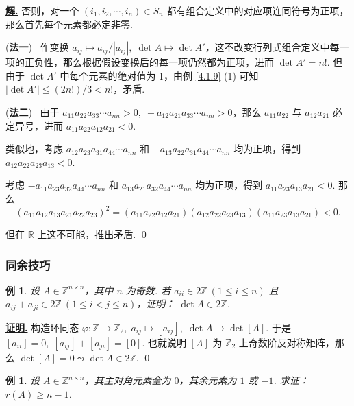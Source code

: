 \documentclass[10pt,openany]{article}
\theoremstyle{thmstyle} %
\theoremstyle{defstyle} %
\theoremstyle{prostyle} %
\theoremstyle{exastyle}
\newtheorem{example}[theorem]{例}
\theoremstyle{remstyle}
\renewenvironment{proof}[1][证明]{\par\underline{\textbf{#1.}} \;\fangsong}{\qed\par}
\newenvironment{solution}{\par\underline{\textbf{解.}} \;\fangsong}{\qed\par}
\newcommand{\R}{\mathbb{R}}
\newcommand{\n}{^{n \times n}}
\begin{document}
\begin{solution}
	否则，对一个 \( (i_1,i_2,\cdots,i_n) \in S_n \) 都有组合定义中的对应项连同符号为正项，那么首先每个元素都必定非零.
	
	(\textbf{法一}) \ 作变换 \( a_{ij} \mapsto a_{ij}/|a_{ij}|, \; \det A \mapsto \det A' \)，这不改变行列式组合定义中每一项的正负性，那么根据假设变换后的每一项仍然都为正项，进而 \( \det A'= n! \). 但由于 \( \det A' \) 中每个元素的绝对值为 1，由例 \ref{4.1.9} (1) 可知 \( |\det A'| \leq (2n!)/3 <n! \)，矛盾.
	
	(\textbf{法二}) \ 由于 \( a_{11}a_{22}a_{33}\cdots a_{nn}>0, \; -a_{12}a_{21}a_{33}\cdots a_{nn}>0 \)，那么 \( a_{11}a_{22} \) 与 \( a_{12}a_{21} \) 必定异号，进而 \( a_{11}a_{22}a_{12}a_{21}<0\). 
	
	类似地，考虑 \( a_{12}a_{23}a_{31}a_{44}\cdots a_{nn} \) 和 \( -a_{13}a_{22}a_{31}a_{44}\cdots a_{nn} \) 均为正项，得到 \( a_{12}a_{22}a_{23}a_{13}<0 \). 
	
	考虑 \( -a_{11}a_{23}a_{32}a_{44}\cdots a_{nn} \) 和 \( a_{13}a_{21}a_{32}a_{44}\cdots a_{nn} \) 均为正项，得到 \( a_{11}a_{23}a_{13}a_{21}<0 \). 那么
	\[(a_{11}a_{12}a_{13}a_{21}a_{22}a_{23})^2=(a_{11}a_{22}a_{12}a_{21})(a_{12}a_{22}a_{23}a_{13})(a_{11}a_{23}a_{13}a_{21})<0. \]
	
	但在 \( \R \) 上这不可能，推出矛盾.
\end{solution}


\subsubsection{同余技巧}

\begin{example}
	设 \( A \in \mathbb{Z}\n \)，其中 \( n \) 为奇数. 若 \( a_{ii} \in 2\mathbb{Z} \ (1\leq i\leq n) \) 且 \( a_{ij}+a_{ji} \in 2\mathbb{Z} \ (1\leq i<j\leq n) \)，证明： \( \det A \in 2\mathbb{Z} \).
\end{example}

\begin{proof}
	构造环同态 \( \varphi:\mathbb{Z} \to \mathbb{Z}_2, \; a_{ij} \mapsto [a_{ij}], \; \det A \mapsto \det [A] \). 于是 \( [a_{ii}]=0, \; [a_{ij}]+[a_{ji}]=[0] \). 也就说明 \( [A] \) 为 \( \mathbb{Z}_2 \) 上奇数阶反对称矩阵，那么 \( \det [A]=0 \leadsto \det A \in 2\mathbb{Z} \).
\end{proof}


\begin{example}
	设 \( A \in \mathbb{Z}\n \)，其主对角元素全为 \( 0 \)，其余元素为 \( 1 \) 或 \(-1\). 求证：\( r(A) \geq n-1 \).
\end{example}
\end{document}
